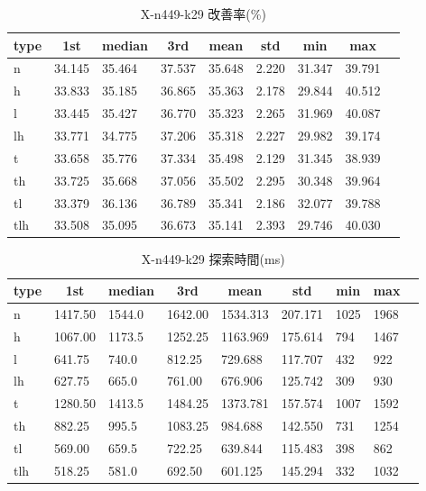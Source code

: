\begin{table}[htbp]
    \centering
    \caption{X-n449-k29 改善率(\%)}
    \begin{tabular}{|l|l|l|l|l|l|l|l|l|}\hline
    \multicolumn{1}{|c|}{\textbf{type}}
    &\multicolumn{1}{|c|}{\textbf{1st}}
    &\multicolumn{1}{c|}{\textbf{median}}
    &\multicolumn{1}{c|}{\textbf{3rd}}
    &\multicolumn{1}{c|}{\textbf{mean}}
    &\multicolumn{1}{c|}{\textbf{std}}
    &\multicolumn{1}{c|}{\textbf{min}}
    &\multicolumn{1}{c|}{\textbf{max}}\\\hline
	n & 34.145 & 35.464 & 37.537 & 35.648 & 2.220 & 31.347 & 39.791\\\hline
	h & 33.833 & 35.185 & 36.865 & 35.363 & 2.178 & 29.844 & 40.512\\\hline
	l & 33.445 & 35.427 & 36.770 & 35.323 & 2.265 & 31.969 & 40.087\\\hline
	lh & 33.771 & 34.775 & 37.206 & 35.318 & 2.227 & 29.982 & 39.174\\\hline
	t & 33.658 & 35.776 & 37.334 & 35.498 & 2.129 & 31.345 & 38.939\\\hline
	th & 33.725 & 35.668 & 37.056 & 35.502 & 2.295 & 30.348 & 39.964\\\hline
	tl & 33.379 & 36.136 & 36.789 & 35.341 & 2.186 & 32.077 & 39.788\\\hline
	tlh & 33.508 & 35.095 & 36.673 & 35.141 & 2.393 & 29.746 & 40.030\\\hline
	\end{tabular}
\end{table}
\begin{table}[htbp]
    \centering
    \caption{X-n449-k29 探索時間(ms)}
    \begin{tabular}{|l|l|l|l|l|l|l|l|l|}\hline
    \multicolumn{1}{|c|}{\textbf{type}}
    &\multicolumn{1}{|c|}{\textbf{1st}}
    &\multicolumn{1}{c|}{\textbf{median}}
    &\multicolumn{1}{c|}{\textbf{3rd}}
    &\multicolumn{1}{c|}{\textbf{mean}}
    &\multicolumn{1}{c|}{\textbf{std}}
    &\multicolumn{1}{c|}{\textbf{min}}
    &\multicolumn{1}{c|}{\textbf{max}}\\\hline
	n & 1417.50 & 1544.0 & 1642.00 & 1534.313 & 207.171 & 1025 & 1968\\\hline
	h & 1067.00 & 1173.5 & 1252.25 & 1163.969 & 175.614 & 794 & 1467\\\hline
	l & 641.75 & 740.0 & 812.25 & 729.688 & 117.707 & 432 & 922\\\hline
	lh & 627.75 & 665.0 & 761.00 & 676.906 & 125.742 & 309 & 930\\\hline
	t & 1280.50 & 1413.5 & 1484.25 & 1373.781 & 157.574 & 1007 & 1592\\\hline
	th & 882.25 & 995.5 & 1083.25 & 984.688 & 142.550 & 731 & 1254\\\hline
	tl & 569.00 & 659.5 & 722.25 & 639.844 & 115.483 & 398 & 862\\\hline
	tlh & 518.25 & 581.0 & 692.50 & 601.125 & 145.294 & 332 & 1032\\\hline
	\end{tabular}
\end{table}
